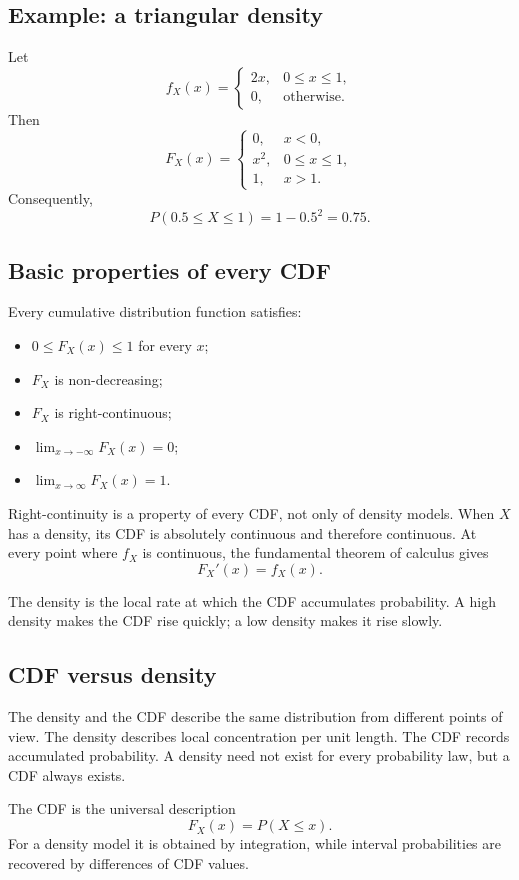 \subsection*{Example: a triangular density}

Let
\[
f_X(x)=
\begin{cases}
2x, & 0\leq x\leq1,\\
0, & \text{otherwise}.
\end{cases}
\]
Then
\[
F_X(x)=
\begin{cases}
0, & x<0,\\
x^2, & 0\leq x\leq1,\\
1, & x>1.
\end{cases}
\]
Consequently,
\[
P(0.5\leq X\leq1)=1-0.5^2=0.75.
\]

\subsection*{Basic properties of every CDF}

Every cumulative distribution function satisfies:
\begin{itemize}
    \item \(0\leq F_X(x)\leq1\) for every \(x\);
    \item \(F_X\) is non-decreasing;
    \item \(F_X\) is right-continuous;
    \item \(\lim_{x\to-\infty}F_X(x)=0\);
    \item \(\lim_{x\to\infty}F_X(x)=1\).
\end{itemize}

Right-continuity is a property of every CDF, not only of density models. When
\(X\) has a density, its CDF is absolutely continuous and therefore continuous.
At every point where \(f_X\) is continuous, the fundamental theorem of calculus
gives
\[
F_X'(x)=f_X(x).
\]

\begin{remarkbox}
The density is the local rate at which the CDF accumulates probability. A high
density makes the CDF rise quickly; a low density makes it rise slowly.
\end{remarkbox}

\subsection*{CDF versus density}

The density and the CDF describe the same distribution from different points of
view. The density describes local concentration per unit length. The CDF records
accumulated probability. A density need not exist for every probability law, but
a CDF always exists.

\begin{summarybox}
The CDF is the universal description
\[
F_X(x)=P(X\leq x).
\]
For a density model it is obtained by integration, while interval probabilities
are recovered by differences of CDF values.
\end{summarybox}
